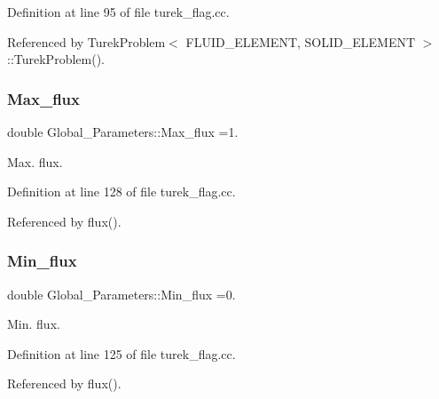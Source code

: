 Definition at line 95 of file turek\+\_\+flag.\+cc.



Referenced by Turek\+Problem$<$ F\+L\+U\+I\+D\+\_\+\+E\+L\+E\+M\+E\+N\+T, S\+O\+L\+I\+D\+\_\+\+E\+L\+E\+M\+E\+N\+T $>$\+::\+Turek\+Problem().

\mbox{\label{namespaceGlobal__Parameters_a13f0d5d16393d21bbc904aea5cff4ea4}} 
\subsubsection{\texorpdfstring{Max\+\_\+flux}{Max\_flux}}
{\footnotesize\ttfamily double Global\+\_\+\+Parameters\+::\+Max\+\_\+flux =1.}



Max. flux. 



Definition at line 128 of file turek\+\_\+flag.\+cc.



Referenced by flux().

\mbox{\label{namespaceGlobal__Parameters_a5aabde2d31d07e5d0a84f6ff02c263dc}} 
\subsubsection{\texorpdfstring{Min\+\_\+flux}{Min\_flux}}
{\footnotesize\ttfamily double Global\+\_\+\+Parameters\+::\+Min\+\_\+flux =0.}



Min. flux. 



Definition at line 125 of file turek\+\_\+flag.\+cc.



Referenced by flux().

\mbox{\label{namespaceGlobal__Parameters_a20fccdcfa2c15ad8b951b9ada3bb1661}} 

